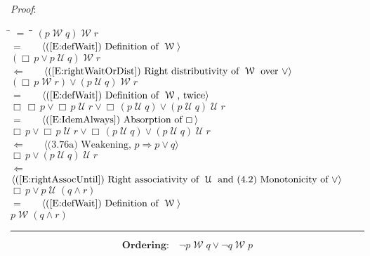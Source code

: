 \documentclass[12pt, fleqn, leqno]{article}
\newcommand{\lgap}{2pt}                             %
\newcommand{\mymathindent}{24pt}                    %
\newcommand{\impl}{\ensuremath{\Rightarrow}}        %
\newcommand{\foll}{\ensuremath{\Leftarrow}}         %
\newcommand{\Until}{\;\mathcal{U}\;}
\newcommand{\Wait}{\;\mathcal{W}\;}
\newcommand{\Always}{\Box\,}
\newcommand{\myqed}{\rule[-.23ex]{1.2ex}{2.0ex}}
\newcommand{\myqedtab}{\hspace{384pt}}              %
\newcommand{\Gll} {\langle}                         %
\newcommand{\Ggg} {\rangle}                         %
\newcommand{\Hint}[1]     {\ \ \ $\Gll              \mbox{#1} \Ggg$ }   %
\begin{document}
\emph{Proof}:
\begin{tabbing}
\hspace{\mymathindent} \= $= \;$ \= \myqedtab \= \kill
\> \>   $(p \Wait q) \Wait r$\\[\lgap]
\> $=$ \> \Hint{(\ref{E:defWait}) Definition of $\Wait$} \\[\lgap]
\> \>   $(\Always p \lor p\Until q) \Wait r$\\[\lgap]
\> $\foll$ \> \Hint{(\ref{E:rightWaitOrDist}) Right distributivity of $\Wait$ over $\lor$} \\[\lgap]
\> \>   $(\Always p\Wait r) \lor (p\Until q) \Wait r$\\[\lgap]
\> $=$ \> \Hint{(\ref{E:defWait}) Definition of $\Wait$, twice} \\[\lgap]
\> \>   $\Always\Always p\lor \Always p\Until r \lor \Always(p\Until q)\lor (p\Until q)\Until r$\\[\lgap]
\> $=$  \>  \Hint{(\ref{E:IdemAlways}) Absorption of $\Always$}\\[\lgap]
\> \>   $\Always p\lor \Always p\Until r \lor \Always(p\Until q)\lor (p\Until q)\Until r$\\[\lgap]
\> $\foll$ \> \Hint{(3.76a) Weakening, $p\impl p\lor q$} \\[\lgap]
\> \>   $\Always p\lor (p\Until q)\Until r$\\[\lgap]
\> $\foll$ \> \Hint{(\ref{E:rightAssocUntil}) Right associativity of $\Until$ and (4.2) Monotonicity of $\lor$} \\[\lgap]
\> \>   $\Always p\lor p\Until (q\land r)$\\[\lgap]
\> $=$ \> \Hint{(\ref{E:defWait}) Definition of $\Wait$} \\[\lgap]
\> \>   $p \Wait (q \land r)$ \quad \myqed
\end{tabbing}
\begin{equation}\label{E:waitOrdering}
\textbf{Ordering:}\quad \neg p \Wait q \lor \neg q \Wait p
\end{equation}
\end{document}
